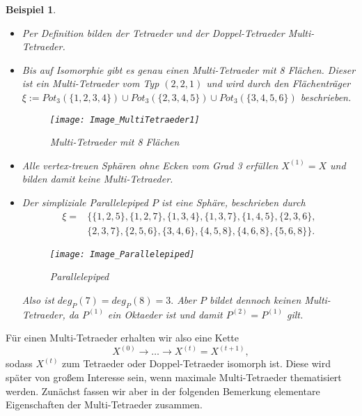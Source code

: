 \documentclass[12pt,titlepage,twoside,cleardoublepage]{article}
\theoremstyle{nummermitklammern}
\newtheorem{bsp}[temp]{Beispiel}
\newtheorem{bsp}[zahl]{Beispiel}
\numberwithin{equation}{section}
\begin{document}
\begin{bsp} \label{bspCactus}
\begin{itemize}
\item Per Definition bilden der Tetraeder und der Doppel-Tetraeder Multi-Tetraeder.
\item Bis auf Isomorphie gibt es genau einen Multi-Tetraeder mit 8 Flächen. Dieser ist ein Multi-Tetraeder vom Typ $(2,2,1)$ und wird durch den Flächenträger $\xi:=Pot_3(\{1,2,3,4\})\cup Pot_3(\{2,3,4,5\})\cup Pot_3(\{3,4,5,6\})$ beschrieben. 
\begin{figure}[H]
\begin{center}
\texttt{[image: Image\_MultiTetraeder1]}
\end{center}
\caption{Multi-Tetraeder mit 8 Flächen}
\end{figure}
\item Alle vertex-treuen Sphären ohne Ecken vom Grad 3 erfüllen $X^{(1)}=X$ und bilden damit keine Multi-Tetraeder.
\item Der simpliziale Parallelepiped $P$ ist eine Sphäre, beschrieben durch 
\begin{align*}
\xi=&\{ \{1, 2, 5 \}, \{ 1, 2, 7 \}, \{ 1, 3, 4 \}, \{ 1, 3, 7 \}, \{ 1, 4, 5 \},\{ 2, 3, 6 \},\\ &\{2, 3, 7 \}, 
\{ 2, 5, 6 \}, \{ 3, 4, 6 \}, \{ 4, 5, 8 \},\{ 4, 6, 8 \}, \{ 5, 6, 8 \} \}.
\end{align*}
\begin{figure}[H]
\begin{center}
\texttt{[image: Image\_Parallelepiped]}
\end{center}
\caption{Parallelepiped}
\end{figure}
Also ist $deg_P(7)=deg_P(8)=3.$ Aber $P$ bildet dennoch keinen Multi-Tetraeder, da $P^{(1)}$ ein Oktaeder ist und damit $P^{(2)}=P^{(1)}$ gilt.
\end{itemize}
\end{bsp}
Für einen Multi-Tetraeder erhalten wir also eine Kette 
\[
X^{(0)}\to \ldots \to X^{(t)}=X^{(t+1)},
\] 
sodass $X^{(t)}$ zum Tetraeder oder Doppel-Tetraeder isomorph ist.
Diese wird später von großem Interesse sein, wenn maximale Multi-Tetraeder thematisiert werden. Zunächst fassen wir aber in der folgenden Bemerkung elementare Eigenschaften der Multi-Tetraeder zusammen.
\end{document}
